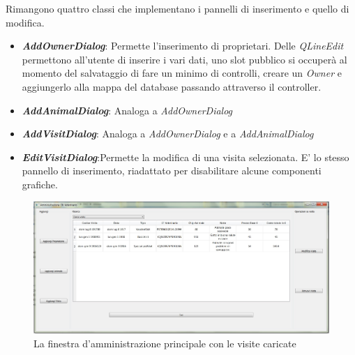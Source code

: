 Rimangono quattro classi che implementano i pannelli di inserimento e quello di modifica.
\begin{itemize}
	\item \textit{\textbf{AddOwnerDialog}}: Permette l'inserimento di proprietari. Delle \textit{QLineEdit} permettono all'utente di inserire i vari dati, uno slot pubblico si occuperà al momento del salvataggio di fare un minimo di controlli, creare un \textit{Owner} e aggiungerlo alla mappa del database passando attraverso il controller.
	\item \textit{\textbf{AddAnimalDialog}}: Analoga a \textit{AddOwnerDialog}
	\item \textit{\textbf{AddVisitDialog}}: Analoga a \textit{AddOwnerDialog} e a \textit{AddAnimalDialog}
	\item \textit{\textbf{EditVisitDialog}}:Permette la modifica di una visita selezionata. E' lo stesso pannello di inserimento, riadattato per disabilitare alcune componenti grafiche.
\end{itemize}

\begin{figure}[H]
	\centering
	\includegraphics[width=\textwidth]{images/main_view_visits.jpg}
	\caption{La finestra d'amministrazione principale con le visite caricate}
\end{figure}


